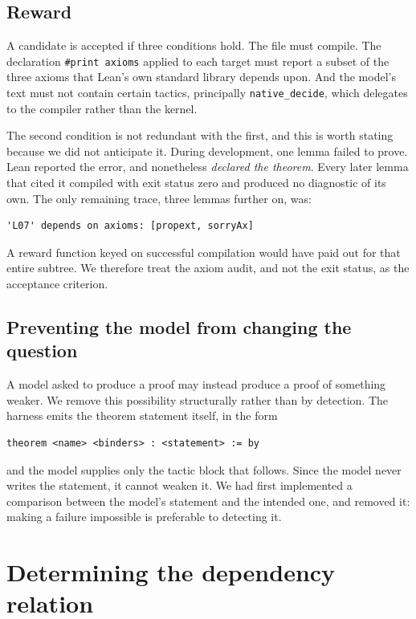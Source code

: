 \documentclass[11pt]{article}
\begin{document}
\subsection{Reward}

A candidate is accepted if three conditions hold. The file must compile. The
declaration \verb|#print axioms| applied to each target must report a subset of
the three axioms that Lean's own standard library depends upon. And the model's
text must not contain certain tactics, principally \verb|native_decide|, which
delegates to the compiler rather than the kernel.

The second condition is not redundant with the first, and this is worth stating
because we did not anticipate it. During development, one lemma failed to prove.
Lean reported the error, and nonetheless \emph{declared the theorem}. Every
later lemma that cited it compiled with exit status zero and produced no
diagnostic of its own. The only remaining trace, three lemmas further on, was:

\begin{lstlisting}
'L07' depends on axioms: [propext, sorryAx]
\end{lstlisting}

A reward function keyed on successful compilation would have paid out for that
entire subtree. We therefore treat the axiom audit, and not the exit status, as
the acceptance criterion.

\subsection{Preventing the model from changing the question}

A model asked to produce a proof may instead produce a proof of something
weaker. We remove this possibility structurally rather than by detection. The
harness emits the theorem statement itself, in the form

\begin{lstlisting}
theorem <name> <binders> : <statement> := by
\end{lstlisting}

and the model supplies only the tactic block that follows. Since the model never
writes the statement, it cannot weaken it. We had first implemented a comparison
between the model's statement and the intended one, and removed it: making a
failure impossible is preferable to detecting it.

\section{Determining the dependency relation}
\label{sec:extract}
\end{document}
